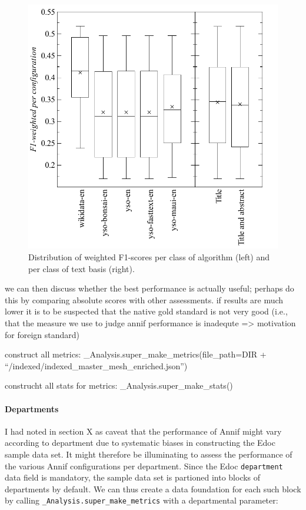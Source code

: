 \begin{figure}
\centering
\includegraphics{images/metrics_all_project+abstract.pdf}
\caption{Distribution of weighted F1-scores per class of algorithm
(left) and per class of text basis (right).}
\end{figure}

we can then discuss whether the best performance is actually useful;
perhaps do this by comparing absolute scores with other assessments. if
results are much lower it is to be suspected that the native gold
standard is not very good (i.e., that the measure we use to judge annif
performance is inadequte =\textgreater{} motivation for foreign
standard)

construct all metrics: \_Analysis.super\_make\_metrics(file\_path=DIR +
``/indexed/indexed\_master\_mesh\_enriched.json'')

construcht all stats for metrics: \_Analysis.super\_make\_stats()

\hypertarget{departments}{%
\paragraph{Departments}\label{departments}}

I had noted in section X as caveat that the performance of Annif might
vary according to department due to systematic biases in constructing
the Edoc sample data set. It might therefore be illuminating to assess
the performance of the various Annif configurations per department.
Since the Edoc \texttt{department} data field is mandatory, the sample
data set is partioned into blocks of departments by default. We can thus
create a data foundation for each such block by calling
\texttt{\_Analysis.super\_make\_metrics} with a departmental parameter:

